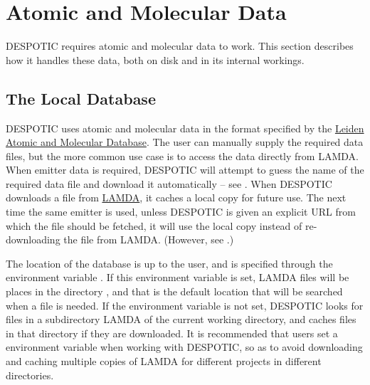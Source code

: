 \documentclass[letterpaper,10pt,english]{sphinxmanual}
\begin{document}
\chapter{Atomic and Molecular Data}
\label{data:sec-data}\label{data:atomic-and-molecular-data}\label{data::doc}
DESPOTIC requires atomic and molecular data to work. This section
describes how it handles these data, both on disk and in its internal
workings.


\section{The Local Database}
\label{data:the-local-database}
DESPOTIC uses atomic and molecular data in the format specified by the
\href{http://home.strw.leidenuniv.nl/~moldata/}{Leiden Atomic and Molecular Database}. The user can manually
supply the required data files, but the more common use case is to
access the data directly from LAMDA. When emitter data is required,
DESPOTIC will attempt to guess the name of the required data file and
download it automatically -- see {\hyperref[cloudfiles:ssec\string-emitters]{}}. When DESPOTIC
downloads a file from \href{http://home.strw.leidenuniv.nl/~moldata/}{LAMDA}, it caches a local copy
for future use. The next time the same emitter is used, unless
DESPOTIC is given an explicit URL from which the file should be
fetched, it will use the local copy instead of re-downloading the file
from LAMDA. (However, see {\hyperref[data:ssec\string-database\string-updates]{}}.)

The location of the database is up to the user, and is specified
through the environment variable . If this
environment variable is set, LAMDA files will be places in the
directory , and that is the default location
that will be searched when a file is needed. If the environment
variable  is not set, DESPOTIC looks for files in a
subdirectory LAMDA of the current working directory, and caches files
in that directory if they are downloaded. It is recommended that users
set a  environment variable when working with
DESPOTIC, so as to avoid downloading and caching multiple copies of
LAMDA for different projects in different directories.
\end{document}
